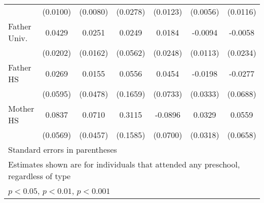 \begin{table}[htbp]
\begin{tabular}{l*{6}{c}}
            &    (0.0100)         &    (0.0080)         &    (0.0278)         &    (0.0123)         &    (0.0056)         &    (0.0116)         \\
\addlinespace
Father Univ.&      0.0429\sym{*}  &      0.0251         &      0.0249         &      0.0184         &     -0.0094         &     -0.0058         \\
            &    (0.0202)         &    (0.0162)         &    (0.0562)         &    (0.0248)         &    (0.0113)         &    (0.0234)         \\
\addlinespace
Father HS   &      0.0269         &      0.0155         &      0.0556         &      0.0454         &     -0.0198         &     -0.0277         \\
            &    (0.0595)         &    (0.0478)         &    (0.1659)         &    (0.0733)         &    (0.0333)         &    (0.0688)         \\
\addlinespace
Mother HS   &      0.0837         &      0.0710         &      0.3115\sym{*}  &     -0.0896         &      0.0329         &      0.0559         \\
            &    (0.0569)         &    (0.0457)         &    (0.1585)         &    (0.0700)         &    (0.0318)         &    (0.0658)         \\
\bottomrule
\multicolumn{7}{l}{\footnotesize Standard errors in parentheses}\\
\multicolumn{7}{l}{\footnotesize Estimates shown are for individuals that attended any preschool, regardless of type}\\
\multicolumn{7}{l}{\footnotesize \sym{*} \(p<0.05\), \sym{**} \(p<0.01\), \sym{***} \(p<0.001\)}\\
\end{tabular}
\end{table}
